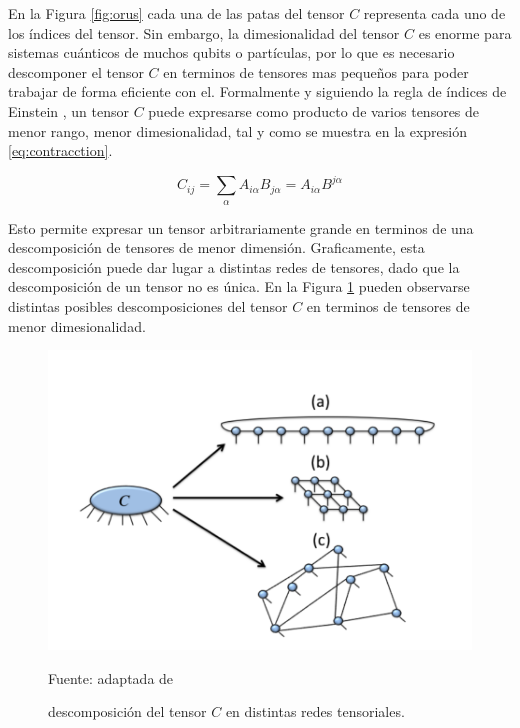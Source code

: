 En la Figura \ref{fig:orus} cada una de las patas del tensor $C$ representa cada uno de los índices del tensor. Sin embargo, la dimesionalidad del tensor $C$ es enorme para sistemas cuánticos de muchos qubits o partículas, por lo que es necesario descomponer el tensor $C$ en terminos de tensores mas pequeños para poder trabajar de forma eficiente con el. Formalmente y siguiendo la regla de índices de Einstein \citep{ahlander}, un tensor $C$ puede expresarse como producto de varios tensores de menor rango, menor dimesionalidad, tal y como se muestra en la expresión \ref{eq:contracction}.

\begin{equation}
    C_{i j} = \sum_{\alpha} A_{i  \alpha} B_{j \alpha} = A_{i  \alpha} B^{j \alpha}
    \label{eq:contracction}
\end{equation}

Esto permite expresar un tensor arbitrariamente grande en terminos de una descomposición de tensores de menor dimensión. Graficamente, esta descomposición puede dar lugar a distintas redes de tensores, dado que la descomposición de un tensor no es única. En la Figura \ref{fig:c_descomposition} pueden observarse distintas posibles descomposiciones del tensor $C$ en terminos de tensores de menor dimesionalidad.


\begin{figure}[!ht]
    \centering
    \includegraphics[scale = 0.7]{img/03-tensor_descomposicion.png}
    \caption{descomposición del tensor $C$ en distintas redes tensoriales.}
    Fuente: adaptada de \cite{orus} 
    \label{fig:c_descomposition}
\end{figure}

